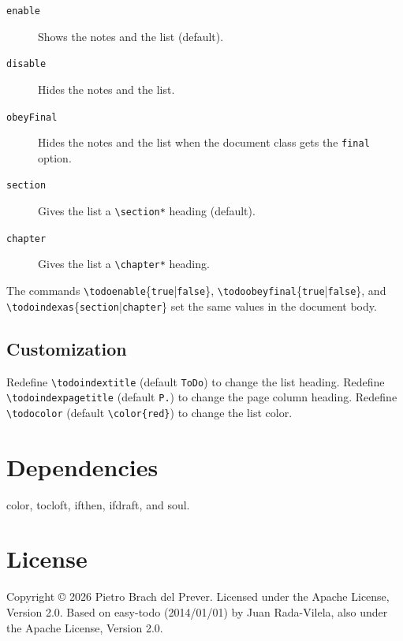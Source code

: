 \documentclass{article}
\newcommand{\cs}[1]{\texttt{\textbackslash#1}}
\begin{document}
\begin{description}
  \item[\texttt{enable}] Shows the notes and the list (default).
  \item[\texttt{disable}] Hides the notes and the list.
  \item[\texttt{obeyFinal}] Hides the notes and the list when the document class
    gets the \texttt{final} option.
  \item[\texttt{section}] Gives the list a \cs{section*} heading (default).
  \item[\texttt{chapter}] Gives the list a \cs{chapter*} heading.
\end{description}

The commands \cs{todoenable}\{\texttt{true}|\texttt{false}\},
\cs{todoobeyfinal}\{\texttt{true}|\texttt{false}\}, and
\cs{todoindexas}\{\texttt{section}|\texttt{chapter}\} set the same values in the
document body.

\subsection{Customization}

Redefine \cs{todoindextitle} (default \texttt{ToDo}) to change the list heading.
Redefine \cs{todoindexpagetitle} (default \texttt{P.}) to change the page column
heading. Redefine \cs{todocolor} (default \cs{color\{red\}}) to change the list color.

\section{Dependencies}

\textsf{color}, \textsf{tocloft}, \textsf{ifthen}, \textsf{ifdraft}, and
\textsf{soul}.

\section{License}

Copyright \copyright{} 2026 Pietro Brach del Prever. Licensed under the Apache
License, Version 2.0. Based on \textsf{easy-todo} (2014/01/01) by Juan
Rada-Vilela, also under the Apache License, Version 2.0.
\end{document}
